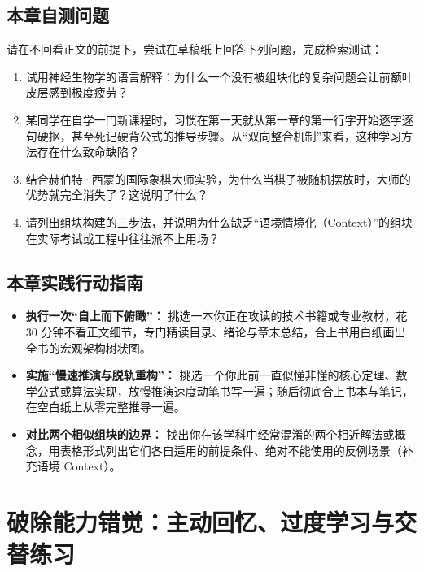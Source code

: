 \documentclass[12pt,a4paper,openany]{ctexbook}
\begin{document}
\section*{本章自测问题}
请在不回看正文的前提下，尝试在草稿纸上回答下列问题，完成检索测试：
\begin{enumerate}
    \item 试用神经生物学的语言解释：为什么一个没有被组块化的复杂问题会让前额叶皮层感到极度疲劳？
    \item 某同学在自学一门新课程时，习惯在第一天就从第一章的第一行字开始逐字逐句硬抠，甚至死记硬背公式的推导步骤。从“双向整合机制”来看，这种学习方法存在什么致命缺陷？
    \item 结合赫伯特·西蒙的国际象棋大师实验，为什么当棋子被随机摆放时，大师的优势就完全消失了？这说明了什么？
    \item 请列出组块构建的三步法，并说明为什么缺乏“语境情境化（Context）”的组块在实际考试或工程中往往派不上用场？
\end{enumerate}

\section*{本章实践行动指南}
\begin{practicebox}[本周组块化构建攻坚清单]
\begin{itemize}
    \item[$\square$] \textbf{执行一次“自上而下俯瞰”：} 挑选一本你正在攻读的技术书籍或专业教材，花 30 分钟不看正文细节，专门精读目录、绪论与章末总结，合上书用白纸画出全书的宏观架构树状图。
    \item[$\square$] \textbf{实施“慢速推演与脱轨重构”：} 挑选一个你此前一直似懂非懂的核心定理、数学公式或算法实现，放慢推演速度动笔书写一遍；随后彻底合上书本与笔记，在空白纸上从零完整推导一遍。
    \item[$\square$] \textbf{对比两个相似组块的边界：} 找出你在该学科中经常混淆的两个相近解法或概念，用表格形式列出它们各自适用的前提条件、绝对不能使用的反例场景（补充语境 Context）。
\end{itemize}
\end{practicebox}

\chapter{破除能力错觉：主动回忆、过度学习与交替练习}
\end{document}
